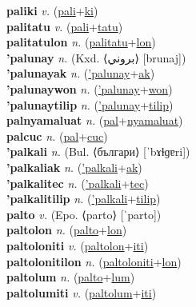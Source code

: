 \textbf{paliki} \textit{v.} (\hyperref[pali]{pali}+\hyperref[ki]{ki})
 \label{paliki} \\
\textbf{palitatu} \textit{v.} (\hyperref[pali]{pali}+\hyperref[tatu]{tatu})
 \label{palitatu} \\
\textbf{palitatulon} \textit{n.} (\hyperref[palitatu]{palitatu}+\hyperref[lon]{lon})
 \label{palitatulon} \\
\textbf{'palunay} \textit{n.} (Kxd. ⟨بروني⟩ [brunaj])
 \label{'palunay} \\
\textbf{'palunayak} \textit{n.} (\hyperref['palunay]{'palunay}+\hyperref[ak]{ak})
 \label{'palunayak} \\
\textbf{'palunaywon} \textit{n.} (\hyperref['palunay]{'palunay}+\hyperref[won]{won})
 \label{'palunaywon} \\
\textbf{'palunaytilip} \textit{n.} (\hyperref['palunay]{'palunay}+\hyperref[tilip]{tilip})
 \label{'palunaytilip} \\
\textbf{palnyamaluat} \textit{n.} (\hyperref[pal]{pal}+\hyperref[nyamaluat]{nyamaluat})
 \label{palnyamaluat} \\
\textbf{palcuc} \textit{n.} (\hyperref[pal]{pal}+\hyperref[cuc]{cuc})
 \label{palcuc} \\
\textbf{'palkali} \textit{n.} (Bul. ⟨българи⟩ [ˈbɤɫɡɐri])
 \label{'palkali} \\
\textbf{'palkaliak} \textit{n.} (\hyperref['palkali]{'palkali}+\hyperref[ak]{ak})
 \label{'palkaliak} \\
\textbf{'palkalitec} \textit{n.} (\hyperref['palkali]{'palkali}+\hyperref[tec]{tec})
 \label{'palkalitec} \\
\textbf{'palkalitilip} \textit{n.} (\hyperref['palkali]{'palkali}+\hyperref[tilip]{tilip})
 \label{'palkalitilip} \\
\textbf{palto} \textit{v.} (Epo. ⟨parto⟩ [ˈparto])
 \label{palto} \\
\textbf{paltolon} \textit{n.} (\hyperref[palto]{palto}+\hyperref[lon]{lon})
 \label{paltolon} \\
\textbf{paltoloniti} \textit{v.} (\hyperref[paltolon]{paltolon}+\hyperref[iti]{iti})
 \label{paltoloniti} \\
\textbf{paltolonitilon} \textit{n.} (\hyperref[paltoloniti]{paltoloniti}+\hyperref[lon]{lon})
 \label{paltolonitilon} \\
\textbf{paltolum} \textit{n.} (\hyperref[palto]{palto}+\hyperref[lum]{lum})
 \label{paltolum} \\
\textbf{paltolumiti} \textit{v.} (\hyperref[paltolum]{paltolum}+\hyperref[iti]{iti})
